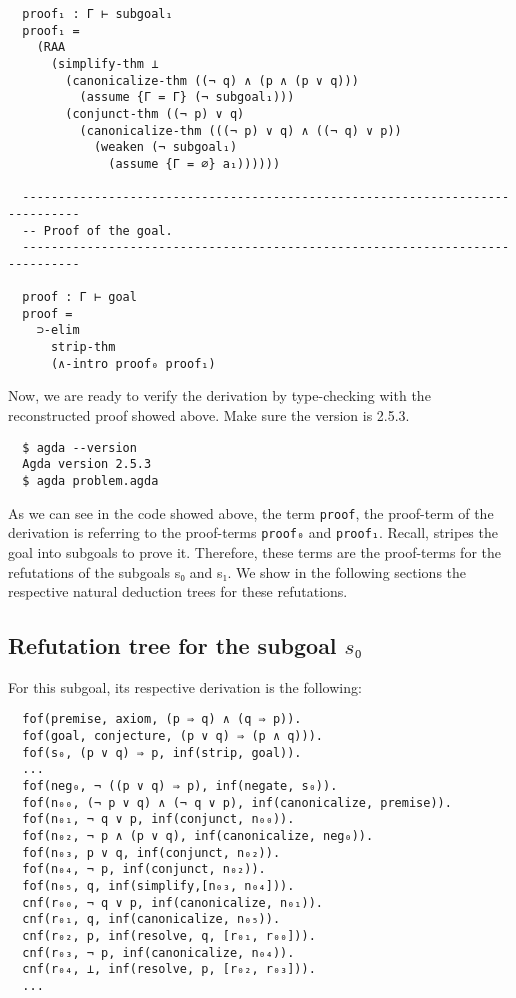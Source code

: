 \documentclass[../main.tex]{subfiles}
\begin{document}
\begin{subappendices}
\begin{verbatim}
  proof₁ : Γ ⊢ subgoal₁
  proof₁ =
    (RAA
      (simplify-thm ⊥
        (canonicalize-thm ((¬ q) ∧ (p ∧ (p ∨ q)))
          (assume {Γ = Γ} (¬ subgoal₁)))
        (conjunct-thm ((¬ p) ∨ q)
          (canonicalize-thm (((¬ p) ∨ q) ∧ ((¬ q) ∨ p))
            (weaken (¬ subgoal₁)
              (assume {Γ = ∅} a₁))))))

  ------------------------------------------------------------------------------
  -- Proof of the goal.
  ------------------------------------------------------------------------------

  proof : Γ ⊢ goal
  proof =
    ⊃-elim
      strip-thm
      (∧-intro proof₀ proof₁)
  \end{verbatim}

Now, we are ready to verify the \Metis derivation by type-checking with
\Agda the reconstructed proof showed above. Make sure the \Agda version is
 2.5.3.

\begin{verbatim}
  $ agda --version
  Agda version 2.5.3
  $ agda problem.agda
\end{verbatim}

As we can see in the \Agda code showed above, the term \verb!proof!, the proof-term
of the \Metis derivation is referring to the proof-terms \verb!proof₀! and \verb!proof₁!.
Recall, \Metis stripes the goal into subgoals to prove it. Therefore, these
terms are the proof-terms for the refutations of the subgoals s₀ and s₁.
We show in the following sections the respective natural deduction trees for these
refutations.

\subsection{Refutation tree for the subgoal $s₀$}
For this subgoal, its respective \TSTP derivation is
the following:

\begin{verbatim}
  fof(premise, axiom, (p ⇒ q) ∧ (q ⇒ p)).
  fof(goal, conjecture, (p ∨ q) ⇒ (p ∧ q))).
  fof(s₀, (p ∨ q) ⇒ p, inf(strip, goal)).
  ...
  fof(neg₀, ¬ ((p ∨ q) ⇒ p), inf(negate, s₀)).
  fof(n₀₀, (¬ p ∨ q) ∧ (¬ q ∨ p), inf(canonicalize, premise)).
  fof(n₀₁, ¬ q ∨ p, inf(conjunct, n₀₀)).
  fof(n₀₂, ¬ p ∧ (p ∨ q), inf(canonicalize, neg₀)).
  fof(n₀₃, p ∨ q, inf(conjunct, n₀₂)).
  fof(n₀₄, ¬ p, inf(conjunct, n₀₂)).
  fof(n₀₅, q, inf(simplify,[n₀₃, n₀₄])).
  cnf(r₀₀, ¬ q ∨ p, inf(canonicalize, n₀₁)).
  cnf(r₀₁, q, inf(canonicalize, n₀₅)).
  cnf(r₀₂, p, inf(resolve, q, [r₀₁, r₀₀])).
  cnf(r₀₃, ¬ p, inf(canonicalize, n₀₄)).
  cnf(r₀₄, ⊥, inf(resolve, p, [r₀₂, r₀₃])).
  ...
\end{verbatim}


\end{subappendices}
\end{document}
